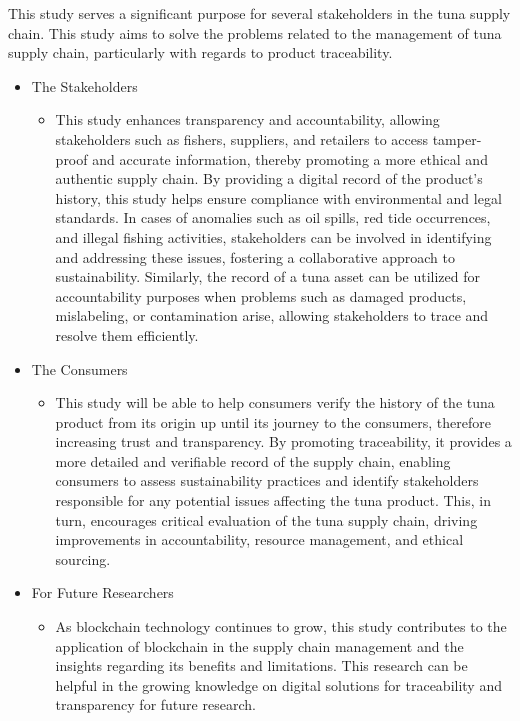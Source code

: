 This study serves a significant purpose for several stakeholders in the tuna supply chain. This study aims to solve the problems related to the management of tuna supply chain, particularly with regards to product traceability.
\begin{itemize}
	\item The Stakeholders 
	\begin{itemize}
		\item This study enhances transparency and accountability, allowing stakeholders such as fishers, suppliers, and retailers to access tamper-proof and accurate information, thereby promoting a more ethical and authentic supply chain. By providing a digital record of the product’s history, this study helps ensure compliance with environmental and legal standards. In cases of anomalies such as oil spills, red tide occurrences, and illegal fishing activities, stakeholders can be involved in identifying and addressing these issues, fostering a collaborative approach to sustainability. Similarly, the record of a tuna asset can be utilized for accountability purposes when problems such as damaged products, mislabeling, or contamination arise, allowing stakeholders to trace and resolve them efficiently.
	\end{itemize}
\end{itemize}
\begin{itemize}
	\item The Consumers
	\begin{itemize}
		\item This study will be able to help consumers verify the history of the tuna product from its origin up until its journey to the consumers, therefore increasing trust and transparency. By promoting traceability, it provides a more detailed and verifiable record of the supply chain, enabling consumers to assess sustainability practices and identify stakeholders responsible for any potential issues affecting the tuna product. This, in turn, encourages critical evaluation of the tuna supply chain, driving improvements in accountability, resource management, and ethical sourcing.
	\end{itemize}
\end{itemize}
\begin{itemize}
	\item For Future Researchers
	\begin{itemize}
		\item As blockchain technology continues to grow, this study contributes to the application of blockchain in the supply chain management and the insights regarding its benefits and limitations. This research can be helpful in the growing knowledge on digital solutions for traceability and transparency for future research. 
	\end{itemize}
\end{itemize}

\begin{comment}
If applicable, describe possible commercialization and/or innovation in your research.
\end{comment}


